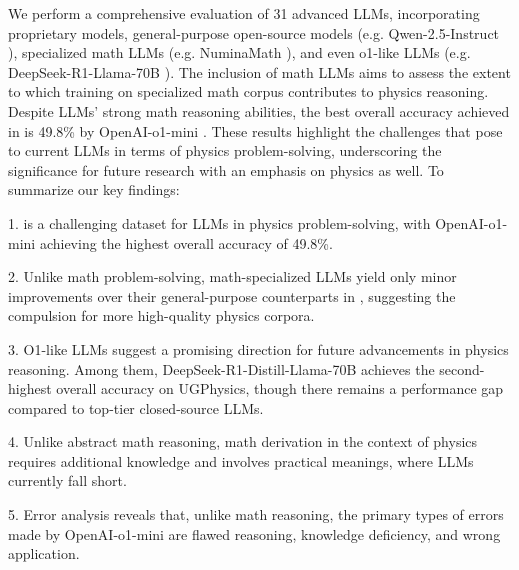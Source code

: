 We perform a comprehensive evaluation of 31 advanced LLMs, incorporating proprietary models, general-purpose open-source models (e.g. Qwen-2.5-Instruct \citep{qwen252024Yang}), specialized math LLMs (e.g. NuminaMath \citep{numinamath7b}), and even o1-like LLMs (e.g. DeepSeek-R1-Llama-70B \citep{deepseekr12025deepseekai}).
The inclusion of math LLMs aims to assess the extent to which training on specialized math corpus contributes to physics reasoning.
Despite LLMs' strong math reasoning abilities, the best overall accuracy achieved in {\benchmark} is 49.8\% by OpenAI-o1-mini \citep{o1}.
These results highlight the challenges that {\benchmark} pose to current LLMs in terms of physics problem-solving, underscoring the significance for future research with an emphasis on physics as well.
To summarize our key findings:

1. {\benchmark} is a challenging dataset for LLMs in physics problem-solving, with OpenAI-o1-mini achieving the highest overall accuracy of 49.8\%.

2. Unlike math problem-solving, math-specialized LLMs yield only minor improvements over their general-purpose counterparts in {\benchmark}, suggesting the compulsion for more high-quality physics corpora.

3. O1-like LLMs suggest a promising direction for future advancements in physics reasoning. Among them, DeepSeek-R1-Distill-Llama-70B achieves the second-highest overall accuracy on UGPhysics, though there remains a performance gap compared to top-tier closed-source LLMs.

4. Unlike abstract math reasoning, math derivation in the context of physics requires additional knowledge and involves practical meanings, where LLMs currently fall short.


5. Error analysis reveals that, unlike math reasoning, the primary types of errors made by OpenAI-o1-mini are flawed reasoning, knowledge deficiency, and wrong application.
